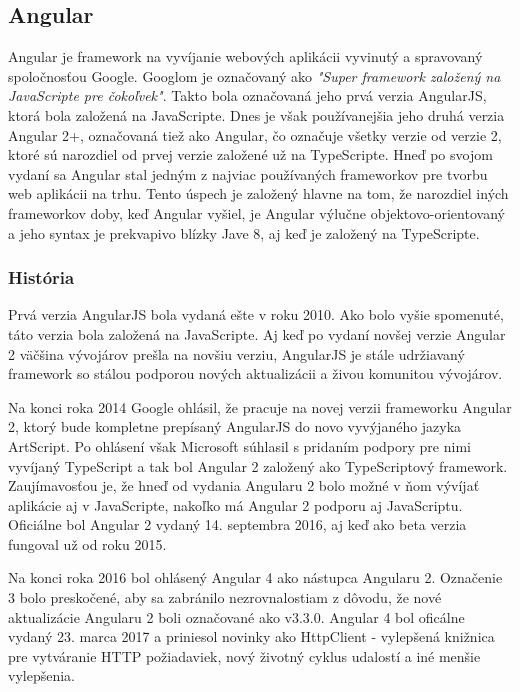 \subsection{Angular}
\indent Angular je framework na vyvíjanie webových aplikácii vyvinutý a spravovaný spoločnosťou Google. Googlom je označovaný ako \textit{"Super framework založený na JavaScripte pre čokoľvek"}. Takto bola označovaná jeho prvá verzia AngularJS, ktorá bola založená na JavaScripte. Dnes je však používanejšia jeho druhá verzia Angular 2+, označovaná tiež ako Angular, čo označuje všetky verzie od verzie 2, ktoré sú narozdiel od prvej verzie založené už na TypeScripte. Hneď po svojom vydaní sa Angular stal jedným z najviac používaných frameworkov pre tvorbu web aplikácii na trhu. Tento úspech je založený hlavne na tom, že narozdiel iných frameworkov doby, keď Angular vyšiel, je Angular výlučne objektovo-orientovaný a jeho syntax je prekvapivo blízky Jave 8, aj keď je založený na TypeScripte\cite{bakalarska_praca,angular_1,angular_2}. 

\subsubsection{História}
\indent Prvá verzia AngularJS bola vydaná ešte v roku 2010. Ako bolo vyšie spomenuté, táto verzia bola založená na JavaScripte. Aj keď po vydaní novšej verzie Angular 2 väčšina vývojárov prešla na novšiu verziu, AngularJS je stále udržiavaný framework so stálou podporou nových aktualizácii a živou komunitou vývojárov. 

\indent Na konci roka 2014 Google ohlásil, že pracuje na novej verzii frameworku Angular 2, ktorý bude kompletne prepísaný AngularJS do novo vyvýjaného jazyka ArtScript. Po ohlásení však Microsoft súhlasil s pridaním podpory pre nimi vyvíjaný TypeScript a tak bol Angular 2 založený ako TypeScriptový framework. Zaujímavosťou je, že hneď od vydania Angularu 2 bolo možné v ňom vývíjať aplikácie aj v JavaScripte, nakoľko má Angular 2 podporu aj JavaScriptu. Oficiálne bol Angular 2 vydaný 14. septembra 2016, aj keď ako beta verzia fungoval už od roku 2015. 

\indent Na konci roka 2016 bol ohlásený Angular 4 ako nástupca Angularu 2. Označenie 3 bolo preskočené, aby sa zabránilo nezrovnalostiam z dôvodu, že nové aktualizácie Angularu 2 boli označované ako v3.3.0. Angular 4 bol oficálne vydaný 23. marca 2017 a priniesol novinky ako HttpClient - vylepšená knižnica pre vytváranie HTTP požiadaviek, nový životný cyklus udalostí a iné menšie vylepšenia. 

